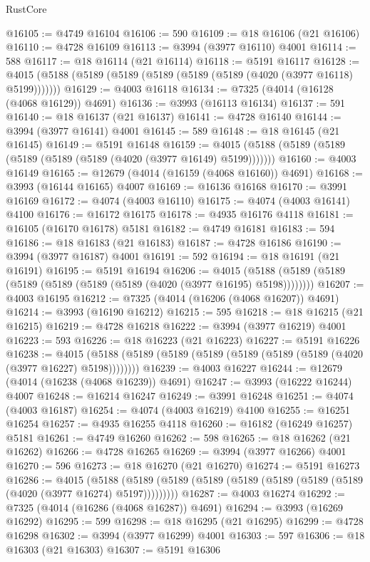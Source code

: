 \begin{lexlean}{RustCore}
\begin{coremodule}
@16105 := @4749 @16104
@16106 := 590
@16109 := @18 @16106 (@21 @16106)
@16110 := @4728 @16109
@16113 := @3994 (@3977 @16110) @4001
@16114 := 588
@16117 := @18 @16114 (@21 @16114)
@16118 := @5191 @16117
@16128 := @4015 (@5188 (@5189 (@5189 (@5189 (@5189 (@5189 (@4020 (@3977 @16118) @5199)))))))
@16129 := @4003 @16118
@16134 := @7325 (@4014 (@16128 (@4068 @16129)) @4691)
@16136 := @3993 (@16113 @16134)
@16137 := 591
@16140 := @18 @16137 (@21 @16137)
@16141 := @4728 @16140
@16144 := @3994 (@3977 @16141) @4001
@16145 := 589
@16148 := @18 @16145 (@21 @16145)
@16149 := @5191 @16148
@16159 := @4015 (@5188 (@5189 (@5189 (@5189 (@5189 (@5189 (@4020 (@3977 @16149) @5199)))))))
@16160 := @4003 @16149
@16165 := @12679 (@4014 (@16159 (@4068 @16160)) @4691)
@16168 := @3993 (@16144 @16165) @4007
@16169 := @16136 @16168
@16170 := @3991 @16169
@16172 := @4074 (@4003 @16110)
@16175 := @4074 (@4003 @16141) @4100
@16176 := @16172 @16175
@16178 := @4935 @16176 @4118
@16181 := @16105 (@16170 @16178) @5181
@16182 := @4749 @16181
@16183 := 594
@16186 := @18 @16183 (@21 @16183)
@16187 := @4728 @16186
@16190 := @3994 (@3977 @16187) @4001
@16191 := 592
@16194 := @18 @16191 (@21 @16191)
@16195 := @5191 @16194
@16206 := @4015 (@5188 (@5189 (@5189 (@5189 (@5189 (@5189 (@5189 (@4020 (@3977 @16195) @5198))))))))
@16207 := @4003 @16195
@16212 := @7325 (@4014 (@16206 (@4068 @16207)) @4691)
@16214 := @3993 (@16190 @16212)
@16215 := 595
@16218 := @18 @16215 (@21 @16215)
@16219 := @4728 @16218
@16222 := @3994 (@3977 @16219) @4001
@16223 := 593
@16226 := @18 @16223 (@21 @16223)
@16227 := @5191 @16226
@16238 := @4015 (@5188 (@5189 (@5189 (@5189 (@5189 (@5189 (@5189 (@4020 (@3977 @16227) @5198))))))))
@16239 := @4003 @16227
@16244 := @12679 (@4014 (@16238 (@4068 @16239)) @4691)
@16247 := @3993 (@16222 @16244) @4007
@16248 := @16214 @16247
@16249 := @3991 @16248
@16251 := @4074 (@4003 @16187)
@16254 := @4074 (@4003 @16219) @4100
@16255 := @16251 @16254
@16257 := @4935 @16255 @4118
@16260 := @16182 (@16249 @16257) @5181
@16261 := @4749 @16260
@16262 := 598
@16265 := @18 @16262 (@21 @16262)
@16266 := @4728 @16265
@16269 := @3994 (@3977 @16266) @4001
@16270 := 596
@16273 := @18 @16270 (@21 @16270)
@16274 := @5191 @16273
@16286 := @4015
    (@5188 (@5189 (@5189 (@5189 (@5189 (@5189 (@5189 (@5189 (@4020 (@3977 @16274) @5197)))))))))
@16287 := @4003 @16274
@16292 := @7325 (@4014 (@16286 (@4068 @16287)) @4691)
@16294 := @3993 (@16269 @16292)
@16295 := 599
@16298 := @18 @16295 (@21 @16295)
@16299 := @4728 @16298
@16302 := @3994 (@3977 @16299) @4001
@16303 := 597
@16306 := @18 @16303 (@21 @16303)
@16307 := @5191 @16306

\end{coremodule}
\end{lexlean}
